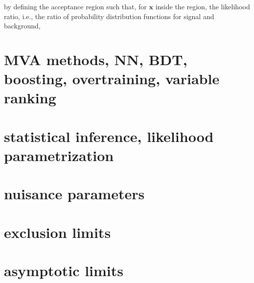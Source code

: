 by defining the acceptance region such that, for $\textbf{x}$ inside the region, the likelihood ratio, i.e., the ratio of probability distribution functions for signal and background,







\section{ MVA methods, NN, BDT, boosting, overtraining, variable ranking  }
\section{statistical inference, likelihood parametrization}
\section{ nuisance parameters}
\section{exclusion limits }
\section{asymptotic limits }


 









